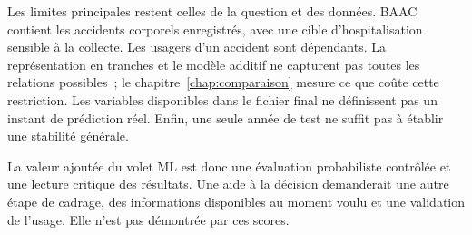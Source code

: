 Les limites principales restent celles de la question et des données. BAAC contient
les accidents corporels enregistrés, avec une cible d'hospitalisation sensible à la
collecte. Les usagers d'un accident sont dépendants. La représentation en tranches
et le modèle additif ne capturent pas toutes les relations possibles~; le
chapitre~\ref{chap:comparaison} mesure ce que coûte cette restriction. Les variables
disponibles dans le fichier final ne définissent pas un instant de prédiction réel.
Enfin, une seule année de test ne suffit pas à établir une stabilité générale.

La valeur ajoutée du volet ML est donc une évaluation probabiliste contrôlée et
une lecture critique des résultats. Une aide à la décision demanderait une autre
étape de cadrage, des informations disponibles au moment voulu et une validation
de l'usage. Elle n'est pas démontrée par ces scores.

\FloatBarrier
{}
